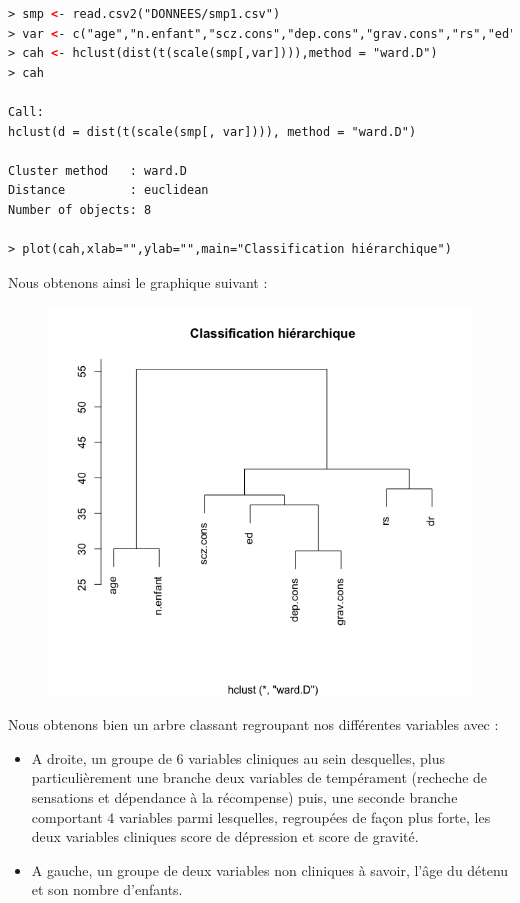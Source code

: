 \begin{lstlisting}[language=html]
> smp <- read.csv2("DONNEES/smp1.csv")
> var <- c("age","n.enfant","scz.cons","dep.cons","grav.cons","rs","ed","dr")
> cah <- hclust(dist(t(scale(smp[,var]))),method = "ward.D")
> cah

Call:
hclust(d = dist(t(scale(smp[, var]))), method = "ward.D")

Cluster method   : ward.D 
Distance         : euclidean 
Number of objects: 8 

> plot(cah,xlab="",ylab="",main="Classification hiérarchique")
\end{lstlisting}

Nous obtenons ainsi le graphique suivant : 

\begin{figure}[H]\begin{center}\includegraphics[scale=0.5]{ilu/ClassGraph.png}\end{center}\end{figure}

Nous obtenons bien un arbre classant regroupant nos différentes variables avec :
\begin{itemize}

\item A droite, un groupe de $6$ variables cliniques au sein desquelles, plus particulièrement une branche deux variables de tempérament (recheche de sensations et dépendance à la récompense) puis, une seconde branche comportant $4$ variables parmi lesquelles, regroupées de façon plus forte, les deux variables cliniques score de dépression et score de gravité.
\item A gauche, un groupe de deux variables non cliniques à savoir, l'âge du détenu et son nombre d'enfants.
\end{itemize}

